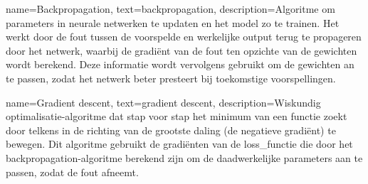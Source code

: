 {
    name={Backpropagation},
    text={backpropagation},
    description={Algoritme om parameters in neurale netwerken te updaten en het model zo te trainen. Het werkt door de fout tussen de voorspelde en werkelijke output terug te propageren door het netwerk, waarbij de gradiënt van de fout ten opzichte van de gewichten wordt berekend. Deze informatie wordt vervolgens gebruikt om de gewichten an te passen, zodat het netwerk beter presteert bij toekomstige voorspellingen. \autocite{Geron_2023}}
}

{
    name={Gradient descent},
    text={gradient descent},
    description={Wiskundig optimalisatie-algoritme dat stap voor stap het minimum van een functie zoekt door telkens in de richting van de grootste daling (de negatieve gradiënt) te bewegen. Dit algoritme gebruikt de gradiënten van de \gls{loss_functie} die door het \gls{backpropagation}-algoritme berekend zijn om de daadwerkelijke parameters aan te passen, zodat de fout afneemt. \autocite{Geron_2023}}
}